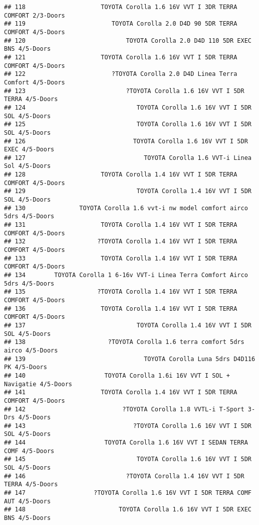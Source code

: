 \documentclass[]{article}
\begin{document}
\begin{verbatim}
## 118                     TOYOTA Corolla 1.6 16V VVT I 3DR TERRA COMFORT 2/3-Doors
## 119                        TOYOTA Corolla 2.0 D4D 90 5DR TERRA COMFORT 4/5-Doors
## 120                            TOYOTA Corolla 2.0 D4D 110 5DR EXEC BNS 4/5-Doors
## 121                     TOYOTA Corolla 1.6 16V VVT I 5DR TERRA COMFORT 4/5-Doors
## 122                        ?TOYOTA Corolla 2.0 D4D Linea Terra Comfort 4/5-Doors
## 123                            ?TOYOTA Corolla 1.6 16V VVT I 5DR TERRA 4/5-Doors
## 124                               TOYOTA Corolla 1.6 16V VVT I 5DR SOL 4/5-Doors
## 125                               TOYOTA Corolla 1.6 16V VVT I 5DR SOL 4/5-Doors
## 126                              TOYOTA Corolla 1.6 16V VVT I 5DR EXEC 4/5-Doors
## 127                                 TOYOTA Corolla 1.6 VVT-i Linea Sol 4/5-Doors
## 128                     TOYOTA Corolla 1.4 16V VVT I 5DR TERRA COMFORT 4/5-Doors
## 129                               TOYOTA Corolla 1.4 16V VVT I 5DR SOL 4/5-Doors
## 130               TOYOTA Corolla 1.6 vvt-i nw model comfort airco 5drs 4/5-Doors
## 131                     TOYOTA Corolla 1.4 16V VVT I 5DR TERRA COMFORT 4/5-Doors
## 132                    ?TOYOTA Corolla 1.4 16V VVT I 5DR TERRA COMFORT 4/5-Doors
## 133                     TOYOTA Corolla 1.4 16V VVT I 5DR TERRA COMFORT 4/5-Doors
## 134        TOYOTA Corolla 1 6-16v VVT-i Linea Terra Comfort Airco 5drs 4/5-Doors
## 135                    ?TOYOTA Corolla 1.4 16V VVT I 5DR TERRA COMFORT 4/5-Doors
## 136                     TOYOTA Corolla 1.4 16V VVT I 5DR TERRA COMFORT 4/5-Doors
## 137                               TOYOTA Corolla 1.4 16V VVT I 5DR SOL 4/5-Doors
## 138                       ?TOYOTA Corolla 1.6 terra comfort 5drs airco 4/5-Doors
## 139                                 TOYOTA Corolla Luna 5drs D4D116 PK 4/5-Doors
## 140                      TOYOTA Corolla 1.6i 16V VVT I SOL + Navigatie 4/5-Doors
## 141                     TOYOTA Corolla 1.4 16V VVT I 5DR TERRA COMFORT 4/5-Doors
## 142                           ?TOYOTA Corolla 1.8 VVTL-i T-Sport 3-Drs 4/5-Doors
## 143                              ?TOYOTA Corolla 1.6 16V VVT I 5DR SOL 4/5-Doors
## 144                      TOYOTA Corolla 1.6 16V VVT I SEDAN TERRA COMF 4/5-Doors
## 145                               TOYOTA Corolla 1.6 16V VVT I 5DR SOL 4/5-Doors
## 146                            ?TOYOTA Corolla 1.4 16V VVT I 5DR TERRA 4/5-Doors
## 147                   ?TOYOTA Corolla 1.6 16V VVT I 5DR TERRA COMF AUT 4/5-Doors
## 148                          TOYOTA Corolla 1.6 16V VVT I 5DR EXEC BNS 4/5-Doors

\end{verbatim}
\end{document}
